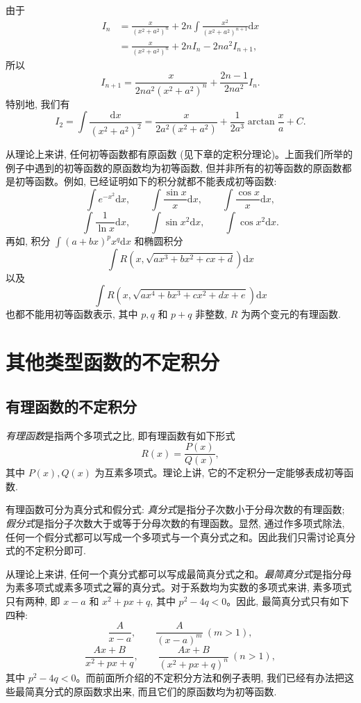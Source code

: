 \begin{solve}
由于
\[
\begin{aligned}
  I_n
  &=
  \frac{x}{(x^2+a^2)^n}
  +
  2n\int\frac{x^2}{(x^2+a^2)^{n+1}}\mathrm dx\\
  &=
  \frac{x}{(x^2+a^2)^n}
  +
  2nI_n-2na^2I_{n+1},
\end{aligned}
\]
所以
\[
  I_{n+1}=
  \frac{x}{2na^2(x^2+a^2)^n}+\frac{2n-1}{2na^2}I_n.
\]
特别地, 我们有
\[
  I_2=
  \int\frac{\mathrm dx}{(x^2+a^2)^2}
  =
  \frac{x}{2a^2(x^2+a^2)}+\frac1{2a^3}\arctan\frac xa+C.
\]

从理论上来讲, 任何初等函数都有原函数 (见下章的定积分理论)。上面我们所举的例子中遇到的初等函数的原函数均为初等函数, 但并非所有的初等函数的原函数都是初等函数。例如, 已经证明如下的积分就都不能表成初等函数:
\[
  \int e^{-x^2}\mathrm dx,\qquad
  \int\frac{\sin x}{x}\mathrm dx,\qquad
  \int\frac{\cos x}{x}\mathrm dx,
\]
\[
  \int\frac1{\ln x}\mathrm dx,\qquad
  \int\sin x^2\mathrm dx,\qquad
  \int\cos x^2\mathrm dx.
\]
再如, 积分 $\int(a+bx)^px^q\mathrm dx$ 和椭圆积分
\[
  \int R(x,\sqrt{ax^3+bx^2+cx+d})\mathrm dx
\]
以及
\[
  \int R(x,\sqrt{ax^4+bx^3+cx^2+dx+e})\mathrm dx
\]
也都不能用初等函数表示, 其中 $p,q$ 和 $p+q$ 非整数, $R$ 为两个变元的有理函数.
\end{solve}


\section{其他类型函数的不定积分}
\label{sec:ma-6-3}

\subsection{有理函数的不定积分}
\label{subsec:ma-6-3-1}

\emph{有理函数}是指两个多项式之比, 即有理函数有如下形式
\[
  R(x)=\frac{P(x)}{Q(x)},
\]
其中 $P(x),Q(x)$ 为互素多项式。理论上讲, 它的不定积分一定能够表成初等函数.

有理函数可分为真分式和假分式: \emph{真分式}是指分子次数小于分母次数的有理函数; \emph{假分式}是指分子次数大于或等于分母次数的有理函数。显然, 通过作多项式除法, 任何一个假分式都可以写成一个多项式与一个真分式之和。因此我们只需讨论真分式的不定积分即可.

从理论上来讲, 任何一个真分式都可以写成最简真分式之和。\emph{最简真分式}是指分母为素多项式或素多项式之幂的真分式。对于系数均为实数的多项式来讲, 素多项式只有两种, 即 $x-a$ 和 $x^2+px+q$, 其中 $p^2-4q<0$。因此, 最简真分式只有如下四种:
\[
  \frac A{x-a},\qquad
  \frac A{(x-a)^m}\ (m>1),
\]
\[
  \frac{Ax+B}{x^2+px+q},\qquad
  \frac{Ax+B}{(x^2+px+q)^n}\ (n>1),
\]
其中 $p^2-4q<0$。而前面所介绍的不定积分方法和例子表明, 我们已经有办法把这些最简真分式的原函数求出来, 而且它们的原函数均为初等函数.

